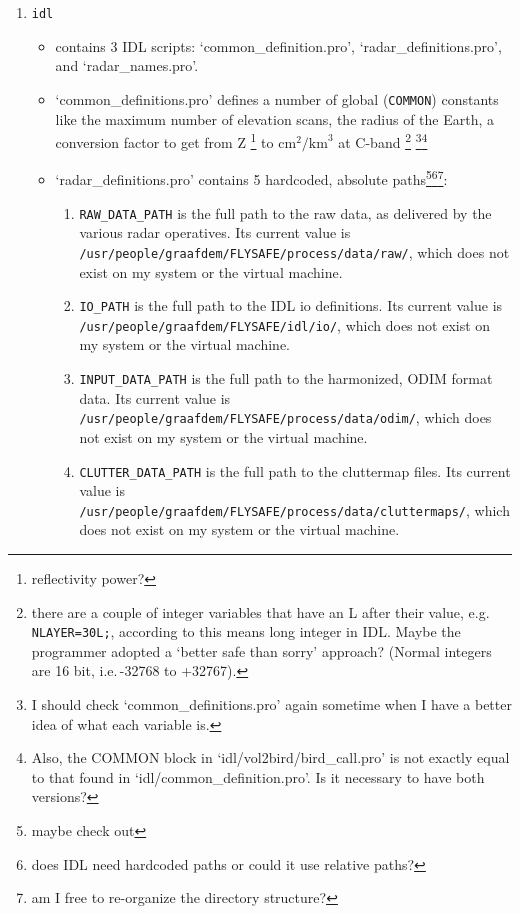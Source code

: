 \begin{enumerate}
\item{\texttt{idl}}
\begin{itemize}
\item{contains 3 IDL scripts: `common\_definition.pro', `radar\_definitions.pro', and `radar\_names.pro'.}
\item{`common\_definitions.pro' defines a number of global (\texttt{COMMON}) constants like the maximum number of elevation scans, the radius of the Earth, a conversion factor to get from Z
\footnote{reflectivity power?} to $\mathrm{cm}^2/\mathrm{km}^3$ at C-band \footnote{there are a couple of integer variables that have an L after their value, e.g. \texttt{NLAYER=30L;}, according to  this means long integer in IDL. Maybe the programmer adopted a `better safe than sorry' approach? (Normal integers are 16 bit, i.e.\,-32768 to +32767).} \footnote{I should check `common\_definitions.pro' again sometime when I have a better idea of what each variable is.}\footnote{Also, the COMMON block in `idl/vol2bird/bird\_call.pro' is not exactly equal to that found in `idl/common\_definition.pro'. Is it necessary to have both versions?}}
\item{`radar\_definitions.pro' contains 5 hardcoded, absolute paths\footnote{maybe check out }\footnote{does IDL need hardcoded paths or could it use relative paths?}\footnote{am I free to re-organize the directory structure?}:}
\begin{enumerate}
\item{\texttt{RAW\_DATA\_PATH} is the full path to the raw data, as delivered by the various radar operatives. Its current value is \texttt{/usr/people/graafdem/FLYSAFE/process/data/raw/}, which does not exist on my system or the virtual machine.}
\item{\texttt{IO\_PATH} is the full path to the IDL io definitions. Its current value is \texttt{/usr/people/graafdem/FLYSAFE/idl/io/}, which does not exist on my system or the virtual machine.}
\item{\texttt{INPUT\_DATA\_PATH} is the full path to the harmonized, ODIM format data. Its current value is \texttt{/usr/people/graafdem/FLYSAFE/process/data/odim/}, which does not exist on my system or the virtual machine.}
\item{\texttt{CLUTTER\_DATA\_PATH} is the full path to the cluttermap files. Its current value is \texttt{/usr/people/graafdem/FLYSAFE/process/data/cluttermaps/}, which does not exist on my system or the virtual machine.}

\end{enumerate}
\end{itemize}
\end{enumerate}
